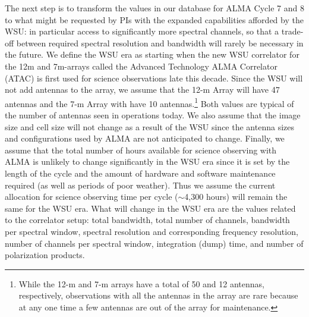 \documentclass[preprint]{aastex631}
\begin{document}
The next step is to transform the values in our database for ALMA Cycle 7 and 8 to what might be requested by PIs with the expanded capabilities afforded by the WSU: in particular access to significantly more spectral channels, so that a trade-off between required spectral resolution and bandwidth will rarely be necessary in the future. We define the WSU era as starting when the new WSU correlator for the 12m and 7m-arrays called the Advanced Technology ALMA Correlator (ATAC) is first used for science observations late this decade. Since the WSU will not add antennas to the array, we assume that the 12-m Array will have 47 antennas and the 7-m Array with have 10 antennas.\footnote{While the 12-m and 7-m arrays have a total of 50 and 12 antennas, respectively, observations with all the antennas in the array are rare because at any one time a few antennas are out of the array for maintenance. } Both values are typical of the number of antennas seen in operations today. We also assume that the image size and cell size will not change as a result of the WSU since the antenna sizes and configurations used by ALMA are not anticipated to change. Finally, we assume that the total number of hours available for science observing with ALMA is unlikely to change significantly in the WSU era since it is set by the length of the cycle and the amount of hardware and software maintenance required (as well as periods of poor weather). Thus we assume the current allocation for science observing time per cycle ($\sim$4,300 hours) will remain the same for the WSU era. What will change in the WSU era are the values related to the correlator setup: total bandwidth, total number of channels,  bandwidth per spectral window, spectral resolution and corresponding frequency resolution, number of channels per spectral window, integration (dump) time, and number of polarization products. 
\end{document}
